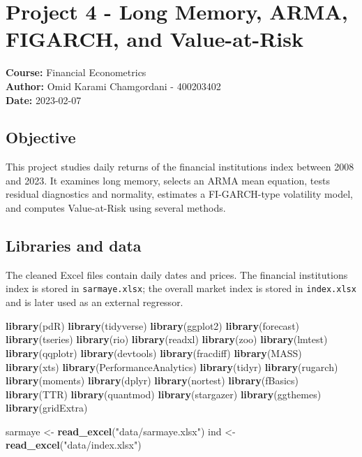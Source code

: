 \documentclass[
  11pt,
]{article}
\author{}
\date{}
\newenvironment{Shaded}{\begin{snugshade}}{\end{snugshade}}
\newcommand{\FunctionTok}[1]{\textcolor[rgb]{0.13,0.29,0.53}{\textbf{#1}}}
\newcommand{\NormalTok}[1]{#1}
\newcommand{\OtherTok}[1]{\textcolor[rgb]{0.56,0.35,0.01}{#1}}
\newcommand{\StringTok}[1]{\textcolor[rgb]{0.31,0.60,0.02}{#1}}
\begin{document}
{
\setcounter{tocdepth}{3}
\tableofcontents
}
\section{Project 4 - Long Memory, ARMA, FIGARCH, and
Value-at-Risk}\label{project-4---long-memory-arma-figarch-and-value-at-risk}

\textbf{Course:} Financial Econometrics\\
\textbf{Author:} Omid Karami Chamgordani - 400203402\\
\textbf{Date:} 2023-02-07

\subsection{Objective}\label{objective}

This project studies daily returns of the financial institutions index
between 2008 and 2023. It examines long memory, selects an ARMA mean
equation, tests residual diagnostics and normality, estimates a
FI-GARCH-type volatility model, and computes Value-at-Risk using several
methods.

\subsection{Libraries and data}\label{libraries-and-data}

The cleaned Excel files contain daily dates and prices. The financial
institutions index is stored in \texttt{sarmaye.xlsx}; the overall
market index is stored in \texttt{index.xlsx} and is later used as an
external regressor.

\begin{Shaded}
\begin{Highlighting}[]
\FunctionTok{library}\NormalTok{(pdR)}
\FunctionTok{library}\NormalTok{(tidyverse)}
\FunctionTok{library}\NormalTok{(ggplot2)}
\FunctionTok{library}\NormalTok{(forecast)}
\FunctionTok{library}\NormalTok{(tseries)}
\FunctionTok{library}\NormalTok{(rio)}
\FunctionTok{library}\NormalTok{(readxl)}
\FunctionTok{library}\NormalTok{(zoo)}
\FunctionTok{library}\NormalTok{(lmtest)}
\FunctionTok{library}\NormalTok{(qqplotr)}
\FunctionTok{library}\NormalTok{(devtools)}
\FunctionTok{library}\NormalTok{(fracdiff)}
\FunctionTok{library}\NormalTok{(MASS)}
\FunctionTok{library}\NormalTok{(xts)}
\FunctionTok{library}\NormalTok{(PerformanceAnalytics)}
\FunctionTok{library}\NormalTok{(tidyr)}
\FunctionTok{library}\NormalTok{(rugarch)}
\FunctionTok{library}\NormalTok{(moments)}
\FunctionTok{library}\NormalTok{(dplyr)}
\FunctionTok{library}\NormalTok{(nortest)}
\FunctionTok{library}\NormalTok{(fBasics)}
\FunctionTok{library}\NormalTok{(TTR)}
\FunctionTok{library}\NormalTok{(quantmod)}
\FunctionTok{library}\NormalTok{(stargazer)}
\FunctionTok{library}\NormalTok{(ggthemes)}
\FunctionTok{library}\NormalTok{(gridExtra)}

\NormalTok{sarmaye }\OtherTok{\textless{}{-}} \FunctionTok{read\_excel}\NormalTok{(}\StringTok{"data/sarmaye.xlsx"}\NormalTok{)}
\NormalTok{ind }\OtherTok{\textless{}{-}} \FunctionTok{read\_excel}\NormalTok{(}\StringTok{"data/index.xlsx"}\NormalTok{)}
\end{Highlighting}
\end{Shaded}
\end{document}
